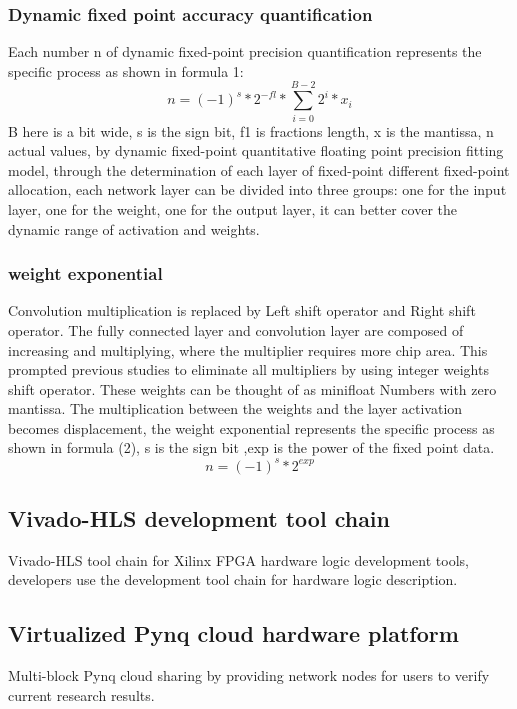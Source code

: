 \subsubsection{Dynamic fixed point accuracy quantification}
Each number n of dynamic fixed-point precision quantification represents the specific process as shown in formula 1:
\begin{equation}
  n = (-1)^s * 2^{-fl} * \sum_{i=0}^{B-2} 2^i * x_i
\end{equation}
B here is a bit wide, s is the sign bit, f1 is fractions length, x is the mantissa, n actual values, by dynamic fixed-point quantitative floating point precision fitting model, through the determination of each layer of fixed-point different fixed-point allocation, each network layer can be divided into three groups: one for the input layer, one for the weight, one for the output layer, it can better cover the dynamic range of activation and weights.

\subsubsection{weight exponential}
Convolution multiplication is replaced by Left shift operator and Right shift operator. The fully connected layer and convolution layer are composed of increasing and multiplying, where the multiplier requires more chip area. This prompted previous studies to eliminate all multipliers by using integer weights shift operator. These weights can be thought of as minifloat Numbers with zero mantissa. The multiplication between the weights and the layer activation becomes displacement, the weight exponential represents the specific process as shown in formula (2), s is the sign bit ,exp is the power of the fixed point data.
\begin{equation}
  n = (-1)^s * 2^{exp}
\end{equation}

\subsection{Vivado-HLS development tool chain}
Vivado-HLS tool chain for Xilinx FPGA hardware logic development tools, developers use the development tool chain for hardware logic description.

\subsection{Virtualized Pynq cloud hardware platform}
Multi-block Pynq cloud sharing by providing network nodes for users to verify current research results.

